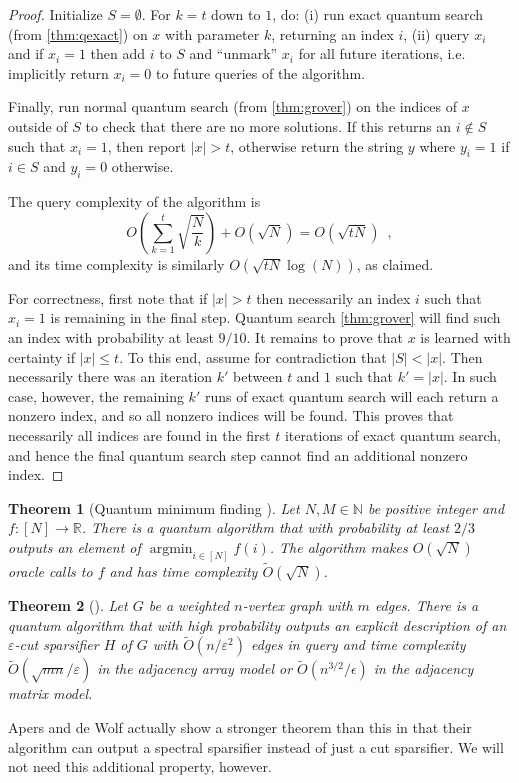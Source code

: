 \documentclass[10pt,a4paper]{article}
\newcommand{\N}{\mathbb{N}}
\newcommand{\R}{\mathbb{R}}
\DeclareMathOperator*{\argmin}{argmin}
\newcommand{\tO}{\tilde O}
\newcommand{\1}{\mathbf{1}}
\newtheorem{theorem}{Theorem}
\theoremstyle{definition}
\begin{document}
\begin{proof}
Initialize $S = \emptyset$.  For $k = t$ down to $1$, do: (i) run exact quantum search (from \cref{thm:qexact}) on $x$ with parameter $k$, returning an index $i$, (ii) query $x_i$ and if $x_i = 1$ then 
add $i$ to $S$ and ``unmark'' $x_i$ for all future iterations, i.e. implicitly return $x_i = 0$ to future queries of the algorithm.

Finally, run normal quantum search (from \cref{thm:grover}) on the indices of $x$ outside of $S$ to check that there are no more solutions.
If this returns an $i \not \in S$ such that $x_i = 1$, then report $|x| > t$, otherwise return the string $y$ where $y_i =1$ if $i \in S$ and 
$y_i = 0$ otherwise.

The query complexity of the algorithm is
\[
O\left( \sum_{k=1}^{t} \sqrt{\frac{N}{k}} \right) + O(\sqrt{N}) = O(\sqrt{t N}) \enspace ,
\]
and its time complexity is similarly $O(\sqrt{tN} \log(N))$, as claimed.

For correctness, first note that if $|x| > t$ then necessarily an index $i$ such that $x_i = 1$ is remaining in the final step.
Quantum search \cref{thm:grover} will find such an index with probability at least $9/10$.
It remains to prove that $x$ is learned with certainty if $|x| \le t$.
To this end, assume for contradiction that $|S| < |x|$.
Then necessarily there was an iteration $k'$ between $t$ and $1$ such that $k' = |x|$.
In such case, however, the remaining $k'$ runs of exact quantum search will each return a nonzero index, and so all nonzero indices will be found.
This proves that necessarily all indices are found in the first $t$ iterations of exact quantum search, and hence the final quantum search step cannot find an additional nonzero index.
\end{proof}

\begin{theorem}[Quantum minimum finding \cite{DH96}]
\label{thm:qmin}
Let $N,M \in \N$ be positive integer and $f: [N] \rightarrow \R$.  There is a quantum algorithm that with probability at least $2/3$ outputs an element of $\argmin_{i \in [N]} f(i)$.
The algorithm makes $O(\sqrt{N})$ oracle calls to $f$ and has time complexity $\tO(\sqrt{N})$.
\end{theorem}

\begin{theorem}[{\cite[Theorem 1]{AdW19}}]
\label{thm:qsparsifier}
Let $G$ be a weighted $n$-vertex graph with $m$ edges.  There is a quantum algorithm that with high probability outputs an explicit description of an 
$\varepsilon$-cut sparsifier $H$ of $G$ with $\tilde O(n/\varepsilon^2)$ edges in query and time complexity $\tilde O(\sqrt{mn}/\varepsilon)$ in the adjacency array model or $\tilde O(n^{3/2}/\epsilon)$ in the adjacency matrix model.
\end{theorem}
Apers and de Wolf actually show a stronger theorem than this in that their algorithm can output a spectral sparsifier instead of 
just a cut sparsifier.  We will not need this additional property, however.
\end{document}
